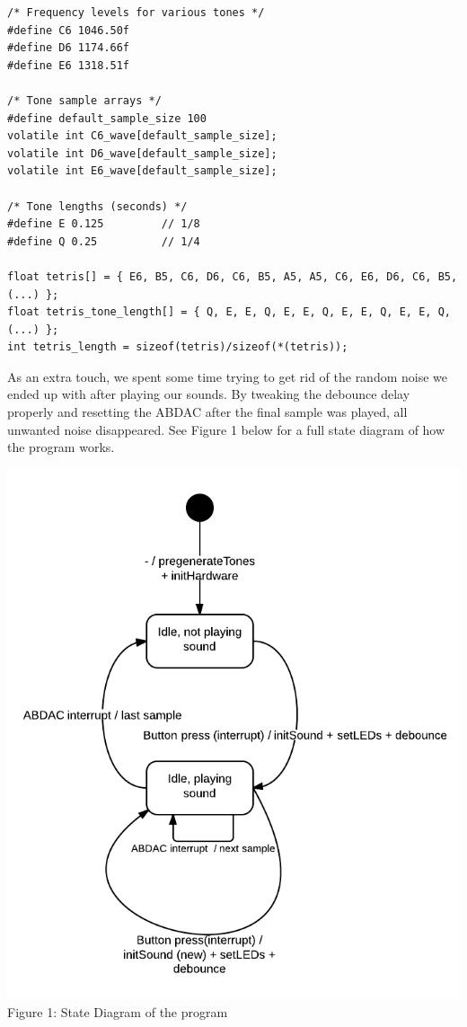 \documentclass[a4paper,11pt]{article}
\begin{document}
\begin{lstlisting}
/* Frequency levels for various tones */
#define C6 1046.50f
#define D6 1174.66f
#define E6 1318.51f

/* Tone sample arrays */
#define default_sample_size 100
volatile int C6_wave[default_sample_size];
volatile int D6_wave[default_sample_size];
volatile int E6_wave[default_sample_size];

/* Tone lengths (seconds) */
#define E 0.125			// 1/8
#define Q 0.25			// 1/4

float tetris[] = { E6, B5, C6, D6, C6, B5, A5, A5, C6, E6, D6, C6, B5, (...) };
float tetris_tone_length[] = { Q, E, E, Q, E, E, Q, E, E, Q, E, E, Q,  (...) };
int tetris_length = sizeof(tetris)/sizeof(*(tetris));
\end{lstlisting}

As an extra touch, we spent some time trying to get rid of the random noise we ended up with after playing our sounds. By tweaking the debounce delay properly and resetting the ABDAC after the final sample was played, all unwanted noise disappeared. See Figure 1 below for a full state diagram of how the program works.

\begin{center}
\centering
\includegraphics[scale=0.75]{images/lucid_chart.png}
\linebreak
Figure 1: State Diagram of the program
\end{center}
\end{document}
